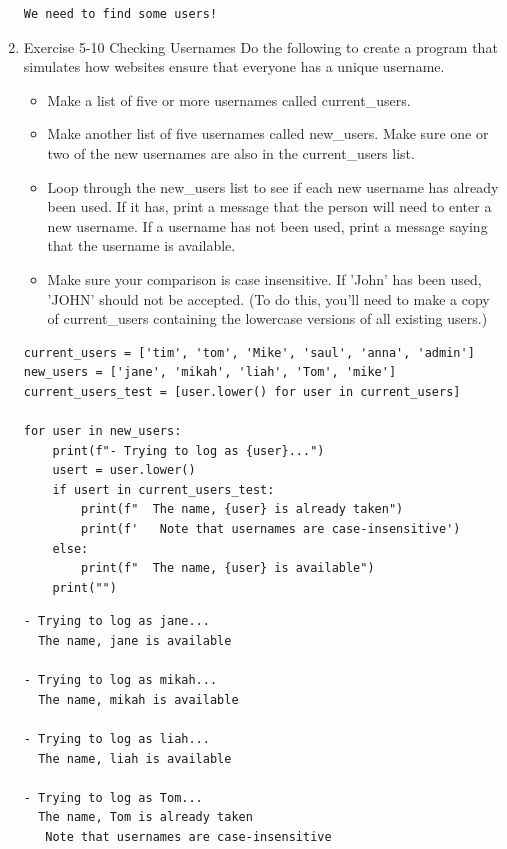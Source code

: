 \documentclass[10pt]{book}
\begin{document}
\begin{enumerate}
\label{org3417bf6}
\begin{verbatim}
We need to find some users!
\end{verbatim}
\item Exercise 5-10 Checking Usernames
\label{sec:org9ec26d0}
Do the following to create a program that simulates how websites ensure that everyone has a unique username.
\begin{itemize}
\item Make a list of five or more usernames called current\_users.
\item Make another list of five usernames called new\_users. Make sure one or two of the new usernames are also in the current\_users list.
\item Loop through the new\_users list to see if each new username has already been used. If it has, print a message that the person will need to enter a new username. If a username has not been used, print a message saying that the username is available.
\item Make sure your comparison is case insensitive. If 'John' has been used, 'JOHN' should not be accepted. (To do this, you’ll need to make a copy of current\_users containing the lowercase versions of all existing users.)
\end{itemize}

\begin{verbatim}
current_users = ['tim', 'tom', 'Mike', 'saul', 'anna', 'admin']
new_users = ['jane', 'mikah', 'liah', 'Tom', 'mike']
current_users_test = [user.lower() for user in current_users]

for user in new_users:
    print(f"- Trying to log as {user}...")
    usert = user.lower()
    if usert in current_users_test:
        print(f"  The name, {user} is already taken")
        print(f'   Note that usernames are case-insensitive')
    else:
        print(f"  The name, {user} is available")
    print("")
\end{verbatim}

\label{orge9c62bc}
\begin{verbatim}
- Trying to log as jane...
  The name, jane is available

- Trying to log as mikah...
  The name, mikah is available

- Trying to log as liah...
  The name, liah is available

- Trying to log as Tom...
  The name, Tom is already taken
   Note that usernames are case-insensitive


\end{verbatim}
\end{enumerate}
\end{document}
